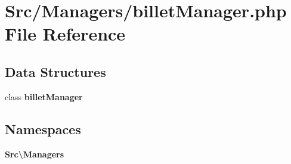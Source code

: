 \section{Src/\+Managers/billet\+Manager.php File Reference}
\label{billet_manager_8php}
\subsection*{Data Structures}
\begin{DoxyCompactItemize}
\item 
class \textbf{ billet\+Manager}
\end{DoxyCompactItemize}
\subsection*{Namespaces}
\begin{DoxyCompactItemize}
\item 
 \textbf{ Src\textbackslash{}\+Managers}
\end{DoxyCompactItemize}
